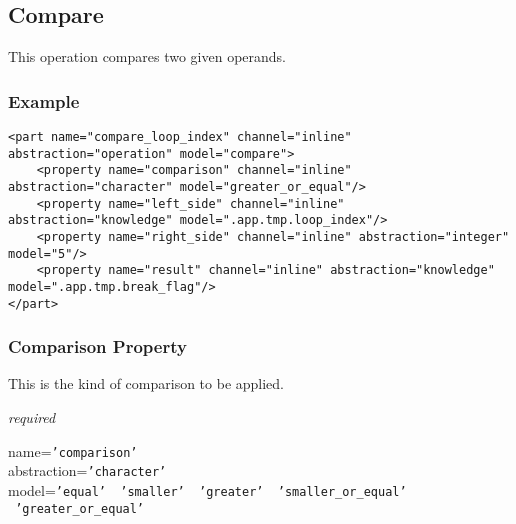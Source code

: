 %
%
%
%
%
%

\subsection{Compare}
\label{compare_heading}

This operation compares two given operands.

\subsubsection{Example}

\begin{scriptsize}
    \begin{verbatim}
<part name="compare_loop_index" channel="inline" abstraction="operation" model="compare">
    <property name="comparison" channel="inline" abstraction="character" model="greater_or_equal"/>
    <property name="left_side" channel="inline" abstraction="knowledge" model=".app.tmp.loop_index"/>
    <property name="right_side" channel="inline" abstraction="integer" model="5"/>
    <property name="result" channel="inline" abstraction="knowledge" model=".app.tmp.break_flag"/>
</part>
    \end{verbatim}
\end{scriptsize}

\subsubsection{Comparison Property}

This is the kind of comparison to be applied.

\emph{required}

name=\texttt{'comparison'}\\
abstraction=\texttt{'character'}\\
model=\texttt{'equal' \vline\ 'smaller' \vline\ 'greater' \vline\ 'smaller\_or\_equal' \vline\ 'greater\_or\_equal'}

